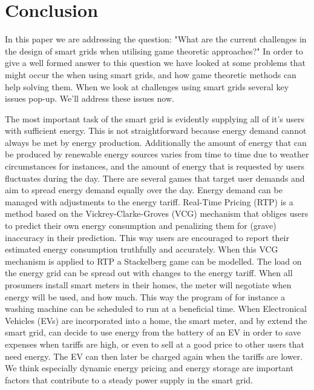 \section{Conclusion}\label{conclusion}

In this paper we are addressing the question: "What are the current challenges in the design of smart grids when utilising game theoretic approaches?" In order to give a well formed answer to this question we have looked at some problems that might occur the when using smart grids, and how game theoretic methods can help solving them. When we look at challenges using smart grids several key issues pop-up. We'll address these issues now. 

The most important task of the smart grid is evidently supplying all of it's users with sufficient energy. This is not straightforward because energy demand cannot always be met by energy production. Additionally the amount of energy that can be produced by renewable energy sources varies from time to time due to weather circumstances for instances, and the amount of energy that is requested by users fluctuates during the day. There are several games that target user demands and aim to spread energy demand equally over the day. Energy demand can be managed with adjustments to the energy tariff. Real-Time Pricing (RTP) is a method based on the Vickrey-Clarke-Groves (VCG) mechanism that obliges users to predict their own energy consumption and penalizing them for (grave) inaccuracy in their prediction. This way users are encouraged to report their estimated energy consumption truthfully and accurately. When this VCG mechanism is applied to RTP a Stackelberg game can be modelled. The load on the energy grid can be spread out with changes to the energy tariff. When all prosumers install smart meters in their homes, the meter will negotiate when energy will be used, and how much. This way the program of for instance a washing machine can be scheduled to run at a beneficial time. When Electronical Vehicles (EVs) are incorporated into a home, the smart meter, and by extend the smart grid, can decide to use energy from the battery of an EV in order to save expenses when tariffs are high, or even to sell at a good price to other users that need energy. The EV can then later be charged again when the tariffs are lower. 
We think especially dynamic energy pricing and energy storage are important factors that contribute to a steady power supply in the smart grid.

